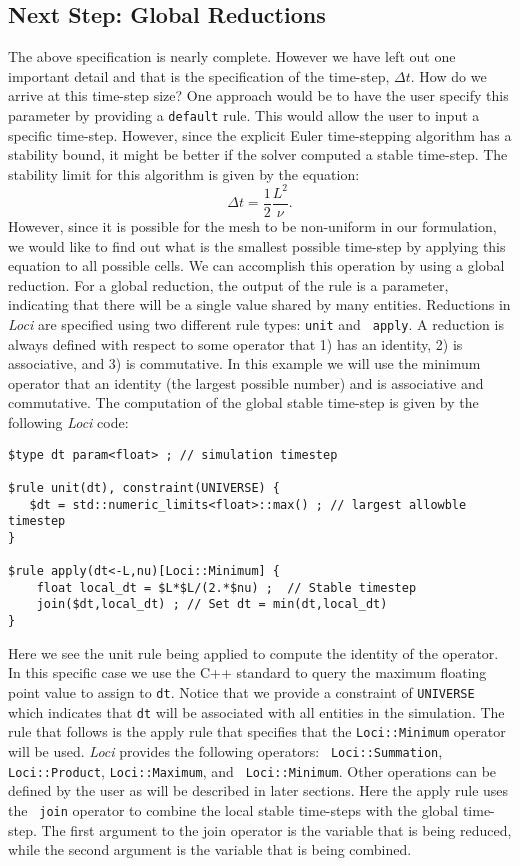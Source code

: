 \documentclass[10pt,epsf,letterpaper,twoside]{book}
\begin{document}
\subsection{Next Step: Global Reductions}

The above specification is nearly complete.  However we have left out
one important detail and that is the specification of the time-step,
$\Delta t$.  How do we arrive at this time-step size?  One approach
would be to have the user specify this parameter by providing a
{\tt default} rule.  This would allow the user to input a specific
time-step.  However, since the explicit Euler time-stepping algorithm
has a stability bound, it might be better if the solver computed a
stable time-step.  The stability limit for this algorithm is given by
the equation:
\begin{equation}
\Delta t = \frac{1}{2}\frac{L^2}{\nu}.
\end{equation}
However, since it is possible for the mesh to be non-uniform in our
formulation, we would like to find out what is the smallest possible
time-step by applying this equation to all possible cells.  We can
accomplish this operation by using a global reduction.  For a global
reduction, the output of the rule is a parameter, indicating that
there will be a single value shared by many entities.  Reductions in
{\it Loci} are specified using two different rule types: {\tt unit} and {\tt
  apply}.  A reduction is always defined with respect to some operator
that 1) has an identity, 2) is associative, and 3) is commutative.
In this example we will use the minimum operator that an identity (the
largest possible number) and is associative and commutative.  The
computation of the global stable time-step is given by the following
{\it Loci} code:
\begin{verbatim}
$type dt param<float> ; // simulation timestep

$rule unit(dt), constraint(UNIVERSE) {
   $dt = std::numeric_limits<float>::max() ; // largest allowble timestep
}

$rule apply(dt<-L,nu)[Loci::Minimum] {
    float local_dt = $L*$L/(2.*$nu) ;  // Stable timestep
    join($dt,local_dt) ; // Set dt = min(dt,local_dt)
}
\end{verbatim}

Here we see the unit rule being applied to compute the identity of the
operator.  In this specific case we use the C++ standard to query the
maximum floating point value to assign to {\tt dt}. Notice that we
provide a constraint of {\tt UNIVERSE} which indicates that {\tt dt}
will be associated with all entities in the simulation.  The rule that
follows is the apply rule that specifies that the {\tt Loci::Minimum}
operator will be used.  {\it Loci} provides the following operators: {\tt
  Loci::Summation}, {\tt Loci::Product}, {\tt Loci::Maximum}, and {\tt
  Loci::Minimum}.  Other operations can be defined by the user as will
be described in later sections.  Here the apply rule uses the {\tt
  join} operator to combine the local stable time-steps with the
global time-step.  The first argument to the join operator is the
variable that is being reduced, while the second argument is the
variable that is being combined.  
\end{document}
